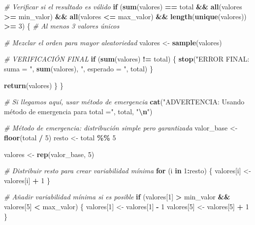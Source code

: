 \documentclass[
]{article}
\newenvironment{Shaded}{\begin{snugshade}}{\end{snugshade}}
\newcommand{\CommentTok}[1]{\textcolor[rgb]{0.56,0.35,0.01}{\textit{#1}}}
\newcommand{\ControlFlowTok}[1]{\textcolor[rgb]{0.13,0.29,0.53}{\textbf{#1}}}
\newcommand{\DecValTok}[1]{\textcolor[rgb]{0.00,0.00,0.81}{#1}}
\newcommand{\FunctionTok}[1]{\textcolor[rgb]{0.13,0.29,0.53}{\textbf{#1}}}
\newcommand{\NormalTok}[1]{#1}
\newcommand{\OtherTok}[1]{\textcolor[rgb]{0.56,0.35,0.01}{#1}}
\newcommand{\SpecialCharTok}[1]{\textcolor[rgb]{0.81,0.36,0.00}{\textbf{#1}}}
\newcommand{\StringTok}[1]{\textcolor[rgb]{0.31,0.60,0.02}{#1}}
\begin{document}
\begin{Shaded}
\begin{Highlighting}[]
    \CommentTok{\# Verificar si el resultado es válido}
    \ControlFlowTok{if}\NormalTok{ (}\FunctionTok{sum}\NormalTok{(valores) }\SpecialCharTok{==}\NormalTok{ total }\SpecialCharTok{\&\&}
        \FunctionTok{all}\NormalTok{(valores }\SpecialCharTok{\textgreater{}=}\NormalTok{ min\_valor) }\SpecialCharTok{\&\&}
        \FunctionTok{all}\NormalTok{(valores }\SpecialCharTok{\textless{}=}\NormalTok{ max\_valor) }\SpecialCharTok{\&\&}
        \FunctionTok{length}\NormalTok{(}\FunctionTok{unique}\NormalTok{(valores)) }\SpecialCharTok{\textgreater{}=} \DecValTok{3}\NormalTok{) \{  }\CommentTok{\# Al menos 3 valores únicos}

      \CommentTok{\# Mezclar el orden para mayor aleatoriedad}
\NormalTok{      valores }\OtherTok{\textless{}{-}} \FunctionTok{sample}\NormalTok{(valores)}

      \CommentTok{\# VERIFICACIÓN FINAL}
      \ControlFlowTok{if}\NormalTok{ (}\FunctionTok{sum}\NormalTok{(valores) }\SpecialCharTok{!=}\NormalTok{ total) \{}
        \FunctionTok{stop}\NormalTok{(}\StringTok{"ERROR FINAL: suma = "}\NormalTok{, }\FunctionTok{sum}\NormalTok{(valores), }\StringTok{", esperado = "}\NormalTok{, total)}
\NormalTok{      \}}

      \FunctionTok{return}\NormalTok{(valores)}
\NormalTok{    \}}
\NormalTok{  \}}

  \CommentTok{\# Si llegamos aquí, usar método de emergencia}
  \FunctionTok{cat}\NormalTok{(}\StringTok{"ADVERTENCIA: Usando método de emergencia para total ="}\NormalTok{, total, }\StringTok{"}\SpecialCharTok{\textbackslash{}n}\StringTok{"}\NormalTok{)}

  \CommentTok{\# Método de emergencia: distribución simple pero garantizada}
\NormalTok{  valor\_base }\OtherTok{\textless{}{-}} \FunctionTok{floor}\NormalTok{(total }\SpecialCharTok{/} \DecValTok{5}\NormalTok{)}
\NormalTok{  resto }\OtherTok{\textless{}{-}}\NormalTok{ total }\SpecialCharTok{\%\%} \DecValTok{5}

\NormalTok{  valores }\OtherTok{\textless{}{-}} \FunctionTok{rep}\NormalTok{(valor\_base, }\DecValTok{5}\NormalTok{)}

  \CommentTok{\# Distribuir resto para crear variabilidad mínima}
  \ControlFlowTok{for}\NormalTok{ (i }\ControlFlowTok{in} \DecValTok{1}\SpecialCharTok{:}\NormalTok{resto) \{}
\NormalTok{    valores[i] }\OtherTok{\textless{}{-}}\NormalTok{ valores[i] }\SpecialCharTok{+} \DecValTok{1}
\NormalTok{  \}}

  \CommentTok{\# Añadir variabilidad mínima si es posible}
  \ControlFlowTok{if}\NormalTok{ (valores[}\DecValTok{1}\NormalTok{] }\SpecialCharTok{\textgreater{}}\NormalTok{ min\_valor }\SpecialCharTok{\&\&}\NormalTok{ valores[}\DecValTok{5}\NormalTok{] }\SpecialCharTok{\textless{}}\NormalTok{ max\_valor) \{}
\NormalTok{    valores[}\DecValTok{1}\NormalTok{] }\OtherTok{\textless{}{-}}\NormalTok{ valores[}\DecValTok{1}\NormalTok{] }\SpecialCharTok{{-}} \DecValTok{1}
\NormalTok{    valores[}\DecValTok{5}\NormalTok{] }\OtherTok{\textless{}{-}}\NormalTok{ valores[}\DecValTok{5}\NormalTok{] }\SpecialCharTok{+} \DecValTok{1}
\NormalTok{  \}}


\end{Highlighting}
\end{Shaded}
\end{document}
